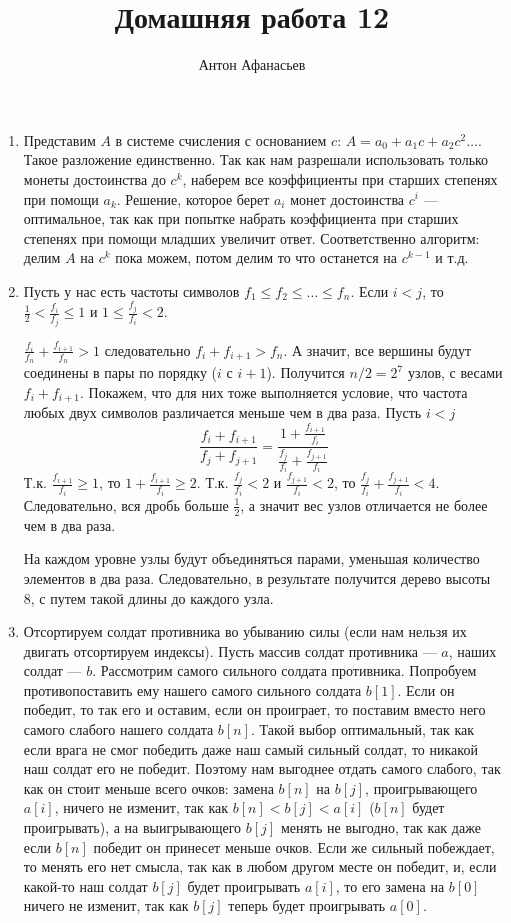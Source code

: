 \documentclass[10pt]{article}
\begin{document}
\title{Домашняя работа 12}
\author{Антон Афанасьев}
\maketitle

\begin{enumerate}

\item Представим $A$ в системе счисления с основанием $c$: $A = a_0 + a_1 c + a_2 c^2 \ldots$. Такое разложение единственно. Так как нам разрешали использовать только монеты достоинства до $c^k$, наберем все коэффициенты при старших степенях при помощи $a_k$. Решение, которое берет $a_i$ монет достоинства $c^i$ --- оптимальное, так как при попытке набрать коэффициента при старших степенях при помощи младших увеличит ответ. Соответственно алгоритм: делим $A$ на $c^k$ пока можем, потом делим то что останется на $c^{k-1}$ и т.д.

\item Пусть у нас есть частоты символов $f_1 \le f_2 \le \ldots \le f_n$. Если $i<j$, то $ \frac{1}{2} < \frac{f_i}{f_j} \le 1$ и $ 1 \le \frac{f_j}{f_i} < 2$. 

$\frac{f_i}{f_n} + \frac{f_{i+1}}{f_n} > 1$ следовательно $f_i + f_{i+1} > f_n$. А значит, все вершины будут соединены в пары по порядку ($i$ с $i+1$). Получится $n/2 = 2^7$ узлов, с весами $f_i + f_{i+1}$. Покажем, что для них тоже выполняется условие, что частота любых двух символов различается меньше чем в два раза. Пусть $i<j$
$$\frac{f_i + f_{i+1}}{f_j + f_{j+1}} = \frac{1 + \frac{f_{i+1}}{f_i}}{\frac{f_j}{f_i} + \frac{f_{j+1}}{f_i}}$$
Т.к. $\frac{f_{i+1}}{f_i} \ge 1$, то $1 + \frac{f_{i+1}}{f_i} \ge 2$. Т.к. $\frac{f_j}{f_i} < 2$ и $\frac{f_{j+1}}{f_i} < 2$, то $\frac{f_j}{f_i} + \frac{f_{j+1}}{f_i} < 4$. Следовательно, вся дробь больше $\frac{1}{2}$, а значит вес узлов отличается не более чем в два раза.

На каждом уровне узлы будут объединяться парами, уменьшая количество элементов в два раза. Следовательно, в результате получится дерево высоты 8, с путем такой длины до каждого узла.

\item Отсортируем солдат противника во убыванию силы (если нам нельзя их двигать отсортируем индексы). Пусть массив солдат противника --- $a$, наших солдат --- $b$. Рассмотрим самого сильного солдата противника. Попробуем противопоставить ему нашего самого сильного солдата $b[1]$. Если он победит, то так его и оставим, если он проиграет, то поставим вместо него самого слабого нашего солдата $b[n]$. Такой выбор оптимальный, так как если врага не смог победить даже наш самый сильный солдат, то никакой наш солдат его не победит. Поэтому нам выгоднее отдать самого слабого, так как он стоит меньше всего очков: замена $b[n]$ на $b[j]$, проигрывающего $a[i]$,  ничего не изменит, так как $b[n] < b[j] < a[i]$ ($b[n]$ будет проигрывать), а на выигрывающего $b[j]$ менять не выгодно, так как даже если $b[n]$ победит он принесет меньше очков. Если же сильный побеждает, то менять его нет смысла, так как в любом другом месте он победит, и, если какой-то наш солдат $b[j]$ будет проигрывать $a[i]$, то его замена на $b[0]$ ничего не изменит, так как $b[j]$ теперь будет проигрывать $a[0]$.


\end{enumerate}
\end{document}
